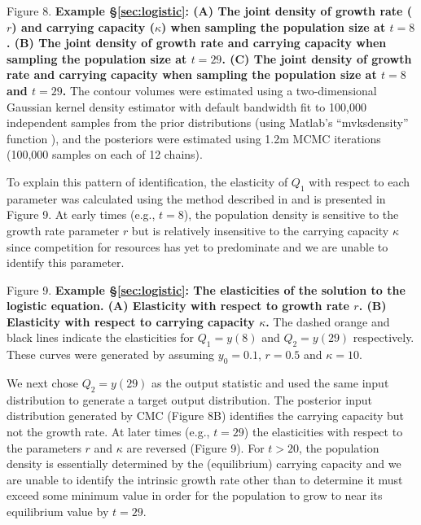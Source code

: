\documentclass[10pt,letterpaper]{article}
\begin{document}
\vspace{0.5cm}

Figure 8. {\bf Example \S \ref{sec:logistic}: (A) The joint density of growth rate ($r$) and carrying capacity ($\kappa$) when sampling the population size at $t=8$. (B) The joint density of  growth rate and carrying capacity when sampling the population size at $t=29$. (C)  The joint density of  growth rate and carrying capacity when sampling the population size at $t=8$ and $t=29$.} The contour volumes were estimated using a two-dimensional Gaussian kernel density estimator with default bandwidth fit to 100,000 independent samples from the prior distributions (using Matlab's ``mvksdensity'' function \cite{MATLAB:2016}), and the posteriors were estimated using 1.2m MCMC iterations (100,000 samples on each of 12 chains).

\vspace{0.5cm}

To explain this pattern of identification, the elasticity of $Q_1$ with respect to each parameter was calculated using the method described in \cite{DGCT2018} and is presented in Figure 9. At early times (e.g., $t=8$), the population density is sensitive to the growth rate parameter $r$ but is relatively insensitive to the carrying capacity $\kappa$ since competition for resources has yet to predominate and we are unable to identify this parameter.

\vspace{0.5cm}

Figure 9. {\bf Example \S \ref{sec:logistic}: The elasticities of the solution to the logistic equation. (A) Elasticity with respect to growth rate $r$. (B) Elasticity with respect to carrying capacity $\kappa$.} The dashed orange and black lines indicate the elasticities for $Q_1=y(8)$ and $Q_2=y(29)$ respectively. These curves were generated by assuming $y_0=0.1$, $r=0.5$ and $\kappa=10$.

\vspace{0.5cm}

We next chose $Q_2 = y(29)$ as the output  statistic and used the same input distribution to generate a target output distribution. The posterior input distribution generated by CMC (Figure 8B) identifies the carrying capacity but not the growth rate. At later times (e.g., $t=29$) the elasticities with respect to the parameters $r$ and $\kappa$ are reversed (Figure 9). For $t>20$, the population density is essentially determined by the (equilibrium) carrying capacity and we are unable to identify the intrinsic growth rate other than to determine it must exceed some minimum value in order for the population to grow to near its equilibrium value by $t=29$.
\end{document}
